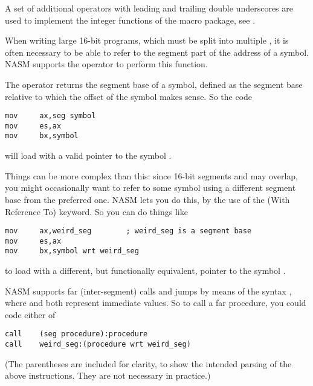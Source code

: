 A set of additional operators with leading and trailing double
underscores are used to implement the integer functions of the
 macro package, see .


When writing large 16-bit programs, which must be split into
multiple , it is often necessary to be able
to refer to the segment part of the address
of a symbol. NASM supports the  operator to perform
this function.

The  operator returns the \emph{}
segment base of a symbol, defined as the segment base relative
to which the offset of the symbol makes sense. So the code

\begin{lstlisting}
mov     ax,seg symbol
mov     es,ax
mov     bx,symbol
\end{lstlisting}

will load  with a valid pointer to the symbol
.

Things can be more complex than this: since 16-bit segments and
 may overlap,
you might occasionally want to refer to some symbol using
a different segment base from the preferred one. NASM lets you
do this, by the use of the  (With Reference To) keyword.
So you can do things like

\begin{lstlisting}
mov     ax,weird_seg        ; weird_seg is a segment base
mov     es,ax
mov     bx,symbol wrt weird_seg
\end{lstlisting}

to load  with a different, but functionally equivalent,
pointer to the symbol .

NASM supports far (inter-segment) calls and jumps by means of the
syntax , where 
and  both represent immediate values. So to call
a far procedure, you could code either of

\begin{lstlisting}
call    (seg procedure):procedure
call    weird_seg:(procedure wrt weird_seg)
\end{lstlisting}

(The parentheses are included for clarity, to show the intended
parsing of the above instructions. They are not necessary in
practice.)

